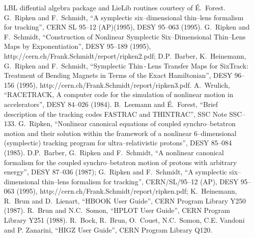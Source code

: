 \begin{thebibliography}{99}
     LBL diffential algebra package and LieLib routines
      courtesy of \'{E}.~Forest. 
     G.~Ripken and F.~Schmidt, ``A symplectic
      six--dimensional thin--lens formalism for tracking'', CERN SL 95--12
      (AP)(1995), DESY 95--063 (1995).  
      G.~Ripken and F.~Schmidt, ``Construction of Nonlinear Symplectic
      Six--Dimensional Thin--Lens Maps by Exponentiation'', DESY 95--189
      (1995),
      {http://cern.ch/Frank.Schmidt/report/ripken2.pdf}; D.P.~Barber,
      K.~Heinemann, G.~Ripken and F.~Schmidt, ``Symplectic Thin\,-\,Lens
      Transfer Maps for SixTrack: Treatment of Bending Magnets in Terms of
      the Exact Hamiltonian'', DESY 96--156 (1995),
      {http://cern.ch/Frank.Schmidt/report/ripken3.pdf}.  
     A.~Wrulich, ``RACETRACK, A computer code for the
      simulation of nonlinear motion in accelerators'', DESY 84--026
      (1984).  
     B.~Leemann and \'{E}.~Forest, ``Brief
      description of the tracking codes FASTRAC and THINTRAC'', SSC Note
      SSC--133.  
     G.~Ripken, ``Nonlinear canonical
      equations of coupled synchro--betatron motion and their solution
      within the framework of a nonlinear 6--dimensional (symplectic)
      tracking program for ultra--relativistic protons'', DESY 85--084
      (1985).  
     D.P.~Barber, G.~Ripken and F.~Schmidt,
      ``A nonlinear canonical formalism for the coupled
      synchro--betatron motion of protons with arbitrary energy'', DESY
      87--036 (1987); G.~Ripken and F.~Schmidt, ``A symplectic
      six--dimensional thin--lens formalism for tracking'', CERN/SL/95--12
      (AP), DESY 95--063 (1995),
      {http://cern.ch/Frank.Schmidt/report/ripken.pdf}; K.~Heinemann,
      R.~Brun and D.~Lienart, ``HBOOK User Guide'', CERN Program Library
      Y250 (1987).  
     R.~Brun and N.C.~Somon, ``HPLOT User
      Guide'', CERN Program Library Y251 (1988).  
     R.~Bock,
      R.~Brun, O.~Couet, N.C.~Somon, C.E. Vandoni and P. Zanarini, ``HIGZ
      User Guide'', CERN Program Library Q120.  

\end{thebibliography}

